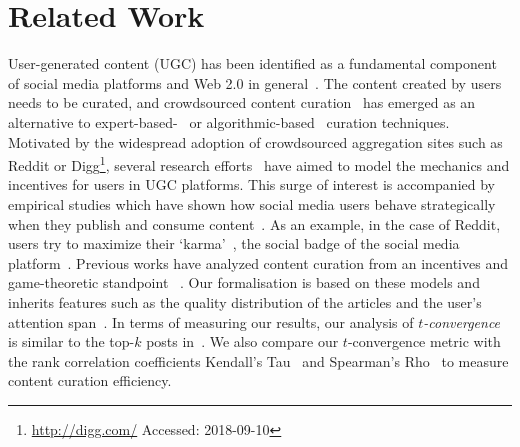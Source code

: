 \section{Related Work}
  User-generated content (UGC) has been identified as a fundamental component of social media platforms and Web 2.0 in general~\cite{kaplan2010users}. The content created by users needs to be curated, and crowdsourced content curation~\cite{askalidis2013theoretical} has emerged as an alternative to expert-based-~\cite{stanoevska2012content} or algorithmic-based~\cite{rader2015understanding} curation techniques. Motivated by the widespread adoption of crowdsourced aggregation sites such as Reddit or Digg\footnote{\url{http://digg.com/} Accessed: 2018-09-10}, several research efforts~\cite{das2010ranking,ghosh2011incentivizing} have aimed to model the mechanics and incentives for users in UGC platforms. This surge of interest is accompanied  by empirical studies which have shown how
social media users behave strategically when they publish and consume content~\cite{may2014filter}. As an example, in the case of Reddit, users try to maximize their `karma'~\cite{bergstrom2011don}, the social badge of the social media platform~\cite{anderson2013steering}.
Previous works have analyzed content curation from an incentives and game-theoretic standpoint~\cite{ghosh2011incentivizing,das2010ranking,gupte2009news,may2014filter} . Our formalisation is based on  these models and inherits features such as the quality distribution of the articles and the user's attention span~\cite{askalidis2013theoretical,ghosh2011incentivizing}. In terms of measuring our results,  our analysis of \textit{$t$-convergence} is similar to the top-$k$ posts in~\cite{askalidis2013theoretical}. We also compare our $t$-convergence metric with the rank correlation coefficients Kendall's Tau~\cite{kendall1955rank} and Spearman's Rho~\cite{spearman1904proof} to measure content curation efficiency.


